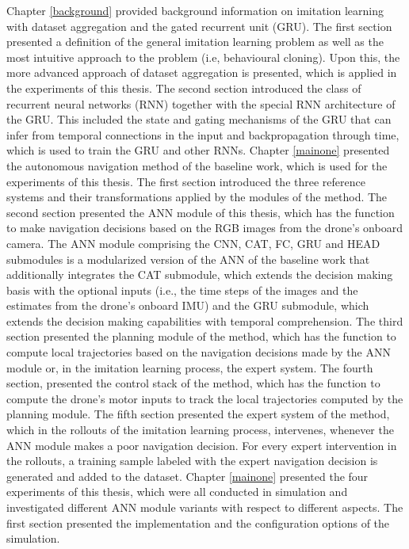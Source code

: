 Chapter \ref{background} provided background information 
on imitation learning with dataset aggregation and the gated recurrent unit (GRU).
The first section presented a definition of the general imitation learning problem
as well as the most intuitive approach to the problem (i.e, behavioural cloning).
Upon this, the more advanced approach of dataset aggregation is presented,
which is applied in the experiments of this thesis.
The second section introduced the class of recurrent neural networks (RNN)
together with the special RNN architecture of the GRU.
This included the state and gating mechanisms of the GRU that can infer from temporal connections in the input
and backpropagation through time, which is used to train the GRU and other RNNs.
Chapter \ref{mainone} presented the autonomous navigation method of the baseline work,
which is used for the experiments of this thesis.
The first section introduced the three reference systems 
and their transformations applied by the modules of the method.
The second section presented the ANN module of this thesis,
which has the function to make navigation decisions based on the RGB images from the drone's onboard camera.
The ANN module comprising the CNN, CAT, FC, GRU and HEAD submodules
is a modularized version of the ANN of the baseline work
that additionally integrates the CAT submodule,
which extends the decision making basis with the optional inputs
(i.e., the time steps of the images and the estimates from the drone's onboard IMU)
and the GRU submodule,
which extends the decision making capabilities with temporal comprehension.
The third section presented the planning module of the method,
which has the function to compute local trajectories based on the navigation decisions made by
the ANN module or, in the imitation learning process, the expert system.
The fourth section, presented the control stack of the method,
which has the function to compute the drone's motor inputs 
to track the local trajectories computed by the planning module.
The fifth section presented the expert system of the method,
which in the rollouts of the imitation learning process,
intervenes, whenever the ANN module makes a poor navigation decision.
For every expert intervention in the rollouts, a training sample 
labeled with the expert navigation decision is generated and added to the dataset.
Chapter \ref{mainone} presented the four experiments of this thesis,
which were all conducted in simulation and investigated different ANN module variants with respect to different aspects.
The first section presented the implementation and the configuration options of the simulation.
